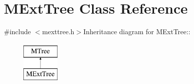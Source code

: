 \hypertarget{classMExtTree}{
\section{MExtTree Class Reference}
\label{classMExtTree}
}


{\ttfamily \#include $<$mexttree.h$>$}Inheritance diagram for MExtTree::\begin{figure}[H]
\begin{center}
\leavevmode
\includegraphics[height=2cm]{classMExtTree}
\end{center}
\end{figure}
